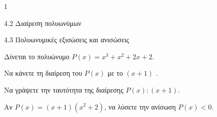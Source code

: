 \begin{ylh}{1}
\item 4.2 Διαίρεση πολυωνύμων
\item 4.3 Πολυωνυμικές εξισώσεις και ανισώσεις
\end{ylh}
Δίνεται το πολυώνυμο $P(x) = x^3 + x^2 + 2x + 2$.
\begin{alist}
\item
\begin{rlist}
\item Να κάνετε τη διαίρεση του $P(x)$ με το $(x + 1)$ .
\item Να γράψετε την ταυτότητα της διαίρεσης $P(x) : (x + 1)$.
\end{rlist}
\item Aν $P(x) = (x + 1)(x^2 + 2)$, να λύσετε την ανίσωση $P(x) < 0$.
\end{alist}

